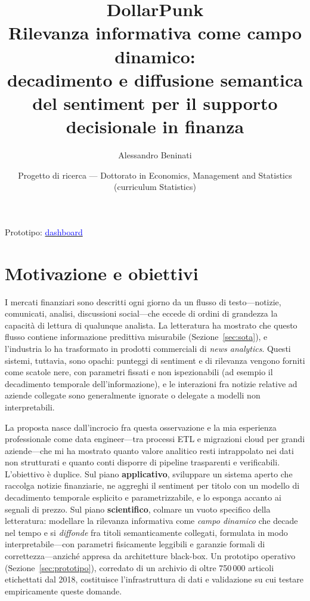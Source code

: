 \documentclass[a4paper,11pt]{article}
\title{\vspace{-1.5em}\textbf{DollarPunk}\\[0.3em]
  {\large Rilevanza informativa come campo dinamico:\\
  decadimento e diffusione semantica del sentiment per il supporto decisionale in finanza}}
\author{Alessandro Beninati}
\date{Progetto di ricerca --- Dottorato in Economics, Management and Statistics (curriculum Statistics)}
\begin{document}
\maketitle
\vspace{-0.6em}
\begin{center}
\small Prototipo: \href{https://dollarpunk-26786f215068.herokuapp.com/dashboard}{\textcolor{blue}{dashboard}}
\end{center}
\vspace{-0.2em}

\section{Motivazione e obiettivi}

I mercati finanziari sono descritti ogni giorno da un flusso di testo---notizie, comunicati, analisi, discussioni social---che eccede di ordini di grandezza la capacità di lettura di qualunque analista. La letteratura ha mostrato che questo flusso contiene informazione predittiva misurabile (Sezione~\ref{sec:sota}), e l'industria lo ha trasformato in prodotti commerciali di \textit{news analytics}. Questi sistemi, tuttavia, sono opachi: punteggi di sentiment e di rilevanza vengono forniti come scatole nere, con parametri fissati e non ispezionabili (ad esempio il decadimento temporale dell'informazione), e le interazioni fra notizie relative ad aziende collegate sono generalmente ignorate o delegate a modelli non interpretabili.

La proposta nasce dall'incrocio fra questa osservazione e la mia esperienza professionale come data engineer---tra processi ETL e migrazioni cloud per grandi aziende---che mi ha mostrato quanto valore analitico resti intrappolato nei dati non strutturati e quanto conti disporre di pipeline trasparenti e verificabili. L'obiettivo è duplice. Sul piano \textbf{applicativo}, sviluppare un sistema aperto che raccolga notizie finanziarie, ne aggreghi il sentiment per titolo con un modello di decadimento temporale esplicito e parametrizzabile, e lo esponga accanto ai segnali di prezzo. Sul piano \textbf{scientifico}, colmare un vuoto specifico della letteratura: modellare la rilevanza informativa come \emph{campo dinamico} che decade nel tempo e si \emph{diffonde} fra titoli semanticamente collegati, formulata in modo interpretabile---con parametri fisicamente leggibili e garanzie formali di correttezza---anziché appresa da architetture black-box. Un prototipo operativo (Sezione~\ref{sec:prototipo}), corredato di un archivio di oltre 750\,000 articoli etichettati dal 2018, costituisce l'infrastruttura di dati e validazione su cui testare empiricamente queste domande.
\end{document}

